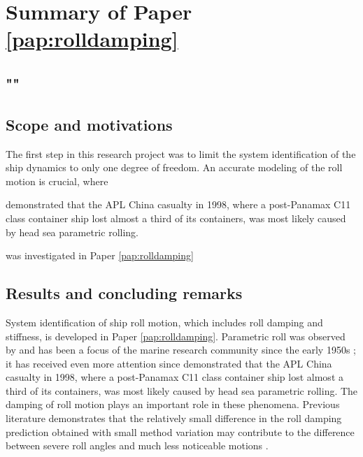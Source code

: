 \section{Summary of Paper \ref{pap:rolldamping}}
\subsection*{""}
\subsection*{Scope and motivations}
The first step in this research project was to limit the system identification of the ship dynamics to only one degree of freedom. An accurate modeling of the roll motion is crucial, where 

\textcite{france_investigation_2001} demonstrated that the APL China casualty in 1998, where a post-Panamax C11 class container ship lost almost a third of its containers, was most likely caused by head sea parametric rolling.

was investigated in Paper \ref{pap:rolldamping} 

\subsection*{Results and concluding remarks}


System identification of ship roll motion, which includes roll damping and stiffness, is developed in Paper \ref{pap:rolldamping}. Parametric roll was observed by \textcite{froudeRollingShips1861} and has been a focus of the marine research community since the early 1950s \parencite{galeazziEarlyDetectionParametric2013}; it has received even more attention since \textcite{franceInvestigationHeadSeaParametric2001} demonstrated that the APL China casualty in 1998, where a post-Panamax C11 class container ship lost almost a third of its containers, was most likely caused by head sea parametric rolling. The damping of roll motion plays an important role in these phenomena. Previous literature demonstrates that the relatively small difference in the roll damping prediction obtained with small method variation may contribute to the difference between severe roll angles and much less noticeable motions \cite{soderIkedaRevisited2019}.

